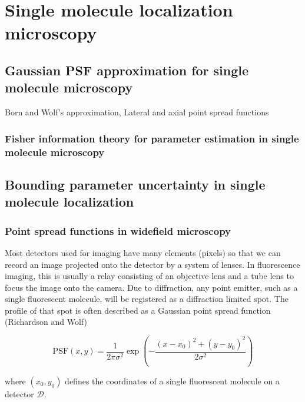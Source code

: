 \documentclass{ucetd}
\begin{document}
\clearpage

\mainmatter

\chapter{Single molecule localization microscopy}


\section{Gaussian PSF approximation for single molecule microscopy}

Born and Wolf's approximation, Lateral and axial point spread functions

\subsection{Fisher information theory for parameter estimation in single molecule microscopy}

\section{Bounding parameter uncertainty in single molecule localization}

\subsection{Point spread functions in widefield microscopy}

Most detectors used for imaging have many elements (pixels) so that we can record an image projected onto the detector by a system of lenses. In fluorescence imaging, this is usually a relay consisting of an objective lens and a tube lens to focus the image onto the camera. Due to diffraction, any point emitter, such as a single fluorescent molecule, will be registered as a diffraction limited spot. The profile of that spot is often described as a Gaussian point spread function (Richardson and Wolf)

\begin{equation}
\mathrm{PSF}(x,y) = \frac{1}{2\pi\sigma^{2}}\exp\left(-\frac{(x-x_{0})^{2}+(y-y_{0})^{2}}{2\sigma^{2}}\right)
\end{equation}

where $(x_0,y_0)$ defines the coordinates of a single fluorescent molecule on a detector $\mathcal{D}$. 
\end{document}

